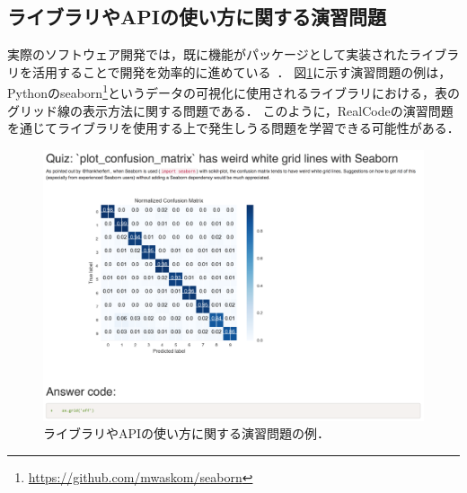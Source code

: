 \subsection{ライブラリやAPIの使い方に関する演習問題}

実際のソフトウェア開発では，既に機能がパッケージとして実装されたライブラリを活用することで開発を効率的に進めている~\cite{Leveraging_API}．
図\ref{fig:lab-study-eg-lib}に示す演習問題の例は，Pythonのseaborn\footnote{\url{https://github.com/mwaskom/seaborn}}というデータの可視化に使用されるライブラリにおける，表のグリッド線の表示方法に関する問題である．
このように，RealCodeの演習問題を通じてライブラリを使用する上で発生しうる問題を学習できる可能性がある．

\begin{figure}[H]
\vspace{0.3cm}
	\centering
  \includegraphics[width=1.0\columnwidth]{20190107-lab-study-lib-exercise.png}
  \caption{ライブラリやAPIの使い方に関する演習問題の例．}
  \label{fig:lab-study-eg-lib}
\end{figure}
